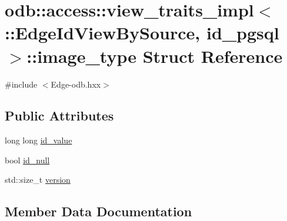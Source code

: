 \hypertarget{structodb_1_1access_1_1view__traits__impl_3_01_1_1_edge_id_view_by_source_00_01id__pgsql_01_4_1_1image__type}{}\section{odb\+:\+:access\+:\+:view\+\_\+traits\+\_\+impl$<$ \+:\+:Edge\+Id\+View\+By\+Source, id\+\_\+pgsql $>$\+:\+:image\+\_\+type Struct Reference}
\label{structodb_1_1access_1_1view__traits__impl_3_01_1_1_edge_id_view_by_source_00_01id__pgsql_01_4_1_1image__type}


{\ttfamily \#include $<$Edge-\/odb.\+hxx$>$}

\subsection*{Public Attributes}
\begin{DoxyCompactItemize}
\item 
long long \hyperlink{structodb_1_1access_1_1view__traits__impl_3_01_1_1_edge_id_view_by_source_00_01id__pgsql_01_4_1_1image__type_ad0c009822f6be93c755b84d26051548b}{id\+\_\+value}
\item 
bool \hyperlink{structodb_1_1access_1_1view__traits__impl_3_01_1_1_edge_id_view_by_source_00_01id__pgsql_01_4_1_1image__type_a2e00c76405cf6dcdaff637b86a12db69}{id\+\_\+null}
\item 
std\+::size\+\_\+t \hyperlink{structodb_1_1access_1_1view__traits__impl_3_01_1_1_edge_id_view_by_source_00_01id__pgsql_01_4_1_1image__type_ab59b6187d277725127a1757d74ebf154}{version}
\end{DoxyCompactItemize}


\subsection{Member Data Documentation}
\hypertarget{structodb_1_1access_1_1view__traits__impl_3_01_1_1_edge_id_view_by_source_00_01id__pgsql_01_4_1_1image__type_a2e00c76405cf6dcdaff637b86a12db69}{}
